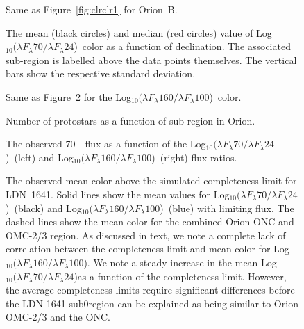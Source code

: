 \documentclass[manuscript]{aastex}
\newcommand{\clra}{Log$_{10}(\lambda F_\lambda70/\lambda F_\lambda24$)}
\newcommand{\clrb}{Log$_{10}(\lambda F_\lambda160/\lambda F_\lambda100$)}
\begin{document}
\clearpage

\begin{figure}[ht]
\centering
{}
\caption{Same as Figure~\ref{fig:clrclr1} for Orion~B.\label{fig:clrclr2}}
\end{figure}

\clearpage

\begin{figure}[ht]
\centering
{}
\caption{The mean (black circles) and median (red circles) value of \clra\ color as a function of declination.  The associated sub-region is labelled above the data points themselves.  The vertical bars show the respective standard deviation.  \label{fig:clr1_v_dec}}
\end{figure}

\clearpage

\begin{figure}[ht]
\centering
{}
\caption{Same as Figure~\ref{fig:clr1_v_dec} for the \clrb\ color.  \label{fig:clr2_v_dec}}
\end{figure}

\clearpage

\begin{figure}[ht]
\centering
{}
\caption{Number of protostars as a function of sub-region in Orion.\label{fig:num_v_dec}}
\end{figure}

\clearpage

\begin{figure}[ht]
\centering
{}
\caption{The observed 70~\micron\ flux as a function of the \clra\ (left) and \clrb\ (right) flux ratios.\label{fig:clrflux}}
\end{figure}

\clearpage

\begin{figure}[ht]
\centering
{}
\caption{The observed mean color above the simulated completeness limit for LDN~1641.  Solid lines show the mean values for \clra\ (black) and \clrb\ (blue) with limiting flux.  The dashed lines show the mean color for the combined Orion ONC and OMC-2/3 region.  As discussed in text, we note a complete lack of correlation between the completeness limit and mean color for \clrb.  We note a steady increase in the mean \clra as a function of the completeness limit.  However, the average completeness limits require significant differences before the LDN 1641 sub0region can be explained as being similar to Orion OMC-2/3 and the ONC.\label{fig:clr_v_limit}}
\end{figure}
\end{document}
